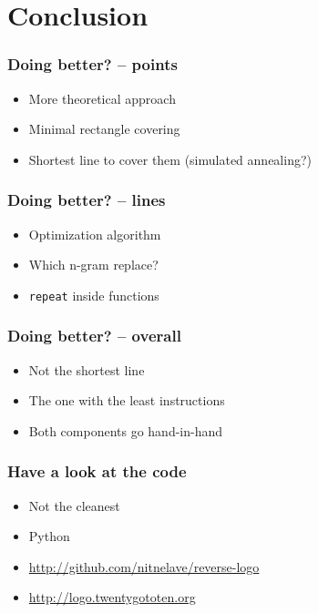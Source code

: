 \section {Conclusion}

\begin{frame}
\frametitle{Doing better? -- points}
  \begin{itemize}
    \item More theoretical approach
    \item Minimal rectangle covering
    \item Shortest line to cover them (simulated annealing?)
  \end{itemize}
\end{frame}

\begin{frame}
\frametitle{Doing better? -- lines}
  \begin{itemize}
    \item Optimization algorithm
    \item Which n-gram replace?
    \item \texttt{repeat} inside functions
  \end{itemize}
\end{frame}

\begin{frame}
\frametitle{Doing better? -- overall}
  \begin{itemize}
    \item Not the shortest line
    \item The one with the least instructions
    \item Both components go hand-in-hand
  \end{itemize}
\end{frame}

\begin{frame}
\frametitle{Have a look at the code}
  \begin{itemize}
    \item Not the cleanest
    \item Python
    \item \url{http://github.com/nitnelave/reverse-logo}
    \item \url{http://logo.twentygototen.org}
  \end{itemize}
\end{frame}
